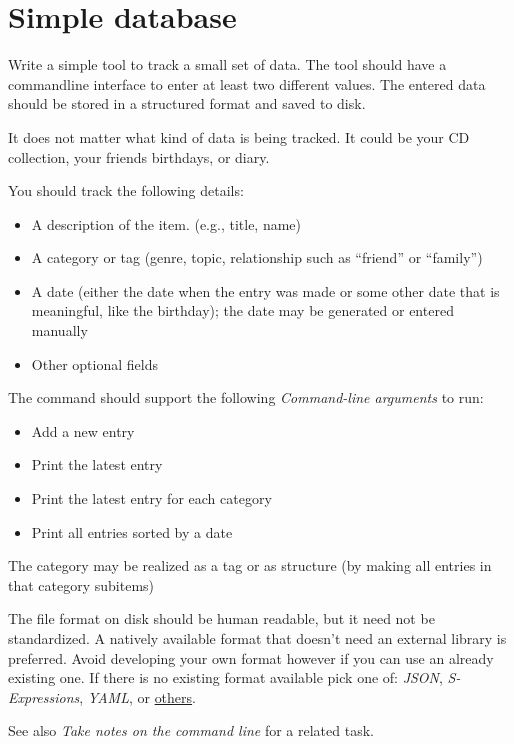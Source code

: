 \pagebreak{}
\section*{Simple database}

Write a simple tool to track a small set of data. The tool should have a
commandline interface to enter at least two different values. The
entered data should be stored in a structured format and saved to disk.

It does not matter what kind of data is being tracked. It could be your
CD collection, your friends birthdays, or diary.

You should track the following details:

\begin{itemize}
\item
  A description of the item. (e.g., title, name)
\item
  A category or tag (genre, topic, relationship such as ``friend'' or
  ``family'')
\item
  A date (either the date when the entry was made or some other date
  that is meaningful, like the birthday); the date may be generated or
  entered manually
\item
  Other optional fields
\end{itemize}

The command should support the following
\emph{Command-line arguments} to run:

\begin{itemize}
\item
  Add a new entry
\item
  Print the latest entry
\item
  Print the latest entry for each category
\item
  Print all entries sorted by a date
\end{itemize}

The category may be realized as a tag or as structure (by making all
entries in that category subitems)

The file format on disk should be human readable, but it need not be
standardized. A natively available format that doesn't need an
external library is preferred. Avoid developing your own format
however if you can use an already existing one. If there is no
existing format available pick one of: \emph{JSON},
\emph{S-Expressions}, \emph{YAML}, or
\href{http://en.wikipedia.org/wiki/Comparison\_of\_data\_serialization\_formats}{others}.

See also \emph{Take notes on the command line} for a related task.


